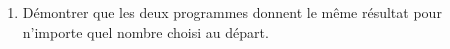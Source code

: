 \documentclass[exercice]{thedocument}%
\begin{document}
%
\begin{enumerate}
    \item Démontrer que les deux programmes donnent le même résultat pour
    n'importe quel nombre choisi au départ.
\end{enumerate}
\end{document}
